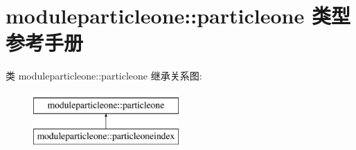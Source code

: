 \hypertarget{structmoduleparticleone_1_1particleone}{}\section{moduleparticleone\+::particleone 类型参考手册}
\label{structmoduleparticleone_1_1particleone}
类 moduleparticleone\+::particleone 继承关系图\+:\begin{figure}[H]
\begin{center}
\leavevmode
\includegraphics[height=2.000000cm]{structmoduleparticleone_1_1particleone}
\end{center}
\end{figure}
